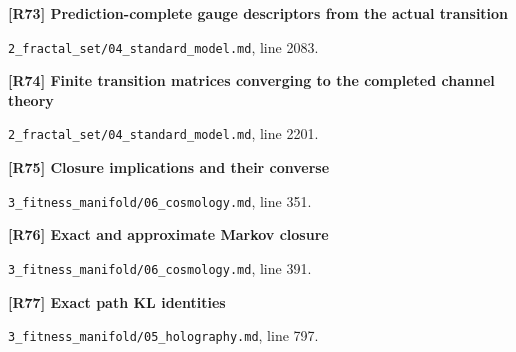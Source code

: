 \documentclass[11pt,a4paper]{article}
\begin{document}
\par\medskip\noindent\begin{minipage}{\linewidth}\textbf{[R73] Prediction-complete gauge descriptors from the actual transition}\label{src:thm-sm-prediction-complete-descriptors}\par
{\small\texttt{}\par
\nolinkurl{2_fractal_set/04_standard_model.md}, line 2083.\par}
\end{minipage}\par

\par\medskip\noindent\begin{minipage}{\linewidth}\textbf{[R74] Finite transition matrices converging to the completed channel theory}\label{src:thm-sm-predictive-partition-convergence}\par
{\small\texttt{}\par
\nolinkurl{2_fractal_set/04_standard_model.md}, line 2201.\par}
\end{minipage}\par

\par\medskip\noindent\begin{minipage}{\linewidth}\textbf{[R75] Closure implications and their converse}\label{src:thm-closure-equivalence-cosmo}\par
{\small\texttt{}\par
\nolinkurl{3_fitness_manifold/06_cosmology.md}, line 351.\par}
\end{minipage}\par

\par\medskip\noindent\begin{minipage}{\linewidth}\textbf{[R76] Exact and approximate Markov closure}\label{src:prop-cosmo-generator-closure}\par
{\small\texttt{}\par
\nolinkurl{3_fitness_manifold/06_cosmology.md}, line 391.\par}
\end{minipage}\par

\par\medskip\noindent\begin{minipage}{\linewidth}\textbf{[R77] Exact path KL identities}\label{src:prop-algorithmic-path-kl-identities}\par
{\small\texttt{}\par
\nolinkurl{3_fitness_manifold/05_holography.md}, line 797.\par}
\end{minipage}\par
\end{document}
